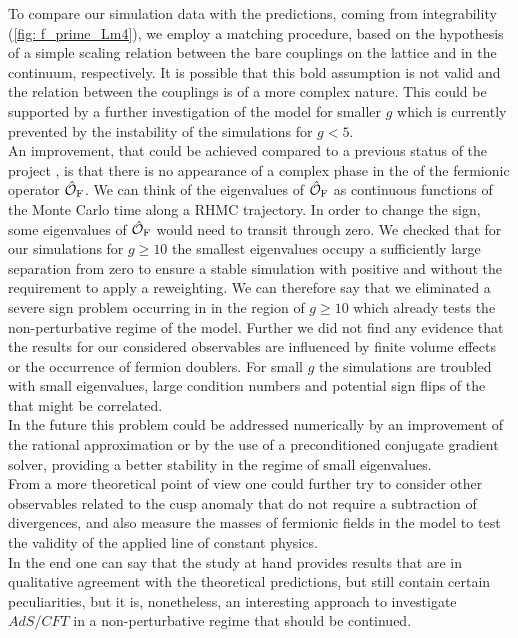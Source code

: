 To compare our simulation data with the predictions, coming from integrability (\autoref{fig: f_prime_Lm4}), we employ a matching procedure, based on the hypothesis of a simple scaling relation between the bare couplings on the lattice and in the continuum, respectively. It is possible that this bold assumption is not valid and the relation between the couplings is of a more complex nature. This could be supported by a further investigation of the model for smaller $g$ which is currently prevented by the instability of the simulations for $g <5$.\\
An improvement, that could be achieved compared to a previous status of the project \cite{Bianchi:2016cyv}, is that there is no appearance of a complex phase in the  of the fermionic operator $\hat{\mathcal{O}}_{\rm F}$. We can think of the eigenvalues of $\hat{\mathcal{O}}_{\rm F}$ as continuous functions of the Monte Carlo time along a RHMC trajectory. In order to change the  sign, some eigenvalues of $\hat{\mathcal{O}}_{\rm F}$ would need to transit through zero. We checked that for our simulations for $g \geq 10$ the smallest eigenvalues occupy a sufficiently large separation from zero to ensure  a stable simulation with positive  and without the requirement to apply a reweighting. We can therefore say that we eliminated a severe sign problem occurring  in \cite{Bianchi:2016cyv} in the region of $g\geq 10$ which already tests the non-perturbative regime of the model. Further we did not find any evidence that the results for our considered observables are influenced by finite volume effects or  the occurrence of fermion doublers. For small $g$ the simulations are troubled with small eigenvalues, large condition numbers and potential sign flips of the  that might be correlated.\\
In the future this problem could be addressed numerically by an improvement of the rational approximation or by the use of a preconditioned conjugate gradient solver, providing a better stability in the regime of small eigenvalues.\\
From a more theoretical point of view one could further try to consider other observables related to the cusp anomaly that do not require a subtraction of divergences, and also measure the masses of fermionic fields in the model to test the validity of the applied line of constant physics.\\
In the end one can say that the study at hand provides results that are in qualitative agreement with the theoretical predictions, but still contain certain peculiarities, but it is, nonetheless, an interesting approach to investigate $AdS/CFT$ in a non-perturbative regime that should be continued.
